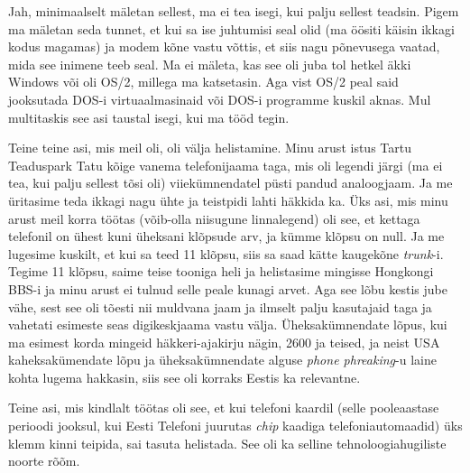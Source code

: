 Jah, minimaalselt mäletan sellest, ma ei tea isegi, kui palju sellest teadsin. Pigem ma mäletan seda tunnet, et kui sa ise juhtumisi seal olid (ma öösiti käisin ikkagi kodus magamas)  ja  modem kõne vastu võttis, et siis nagu põnevusega vaatad, mida see inimene teeb seal. Ma ei mäleta, kas see oli juba tol hetkel äkki Windows või oli OS/2, millega ma katsetasin. Aga vist OS/2 peal said jooksutada DOS-i virtuaalmasinaid või  DOS-i programme kuskil aknas. Mul multitaskis see asi taustal isegi, kui ma tööd tegin.

Teine teine asi, mis meil oli, oli välja helistamine. Minu arust istus Tartu Teaduspark Tatu kõige vanema telefonijaama taga, mis oli legendi järgi (ma ei tea, kui palju sellest tõsi oli) viiekümnendatel püsti pandud analoogjaam. Ja me üritasime teda ikkagi nagu ühte ja teistpidi lahti häkkida ka. Üks asi, mis minu arust meil korra töötas (võib-olla niisugune linnalegend) oli see, et kettaga telefonil on ühest kuni üheksani klõpsude arv, ja kümme klõpsu on null. Ja me lugesime kuskilt, et kui sa teed 11 klõpsu, siis sa saad kätte kaugekõne \emph{trunk}-i. Tegime 11 klõpsu, saime teise tooniga heli ja helistasime mingisse Hongkongi BBS-i ja minu arust ei tulnud selle peale kunagi arvet. Aga see lõbu kestis jube vähe, sest see oli tõesti nii muldvana jaam ja ilmselt palju kasutajaid taga ja vahetati esimeste seas digikeskjaama vastu välja. Üheksakümnendate lõpus, kui ma esimest korda mingeid häkkeri-ajakirju nägin, 2600 ja teised, ja neist USA kaheksakümendate lõpu ja üheksakümnendate alguse \emph{phone phreaking}-u laine kohta lugema hakkasin,  siis see oli korraks Eestis ka relevantne. 

Teine asi, mis kindlalt töötas oli see, et kui telefoni kaardil (selle pooleaastase perioodi jooksul, kui Eesti Telefoni juurutas \emph{chip} kaadiga telefoniautomaadid) üks klemm kinni teipida, sai tasuta helistada. See oli ka selline tehnoloogiahugiliste noorte rõõm.

